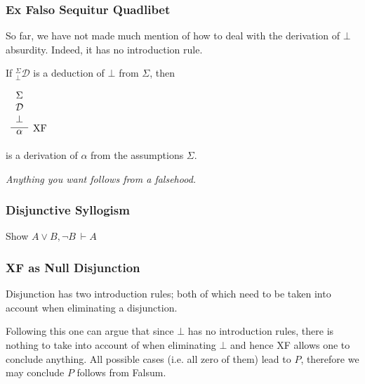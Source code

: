 \documentclass{beamer}
\theoremstyle{indentDefn} \newtheorem{defn}[]{Definition}
\begin{document}
\begin{frame}
	\frametitle{Ex Falso Sequitur Quadlibet}
	
	So far, we have not made much mention of how to deal with the derivation of $\bot$ absurdity. Indeed, it has no introduction rule. 
	
	\vspace{0.5cm}
		
	If $^{\Sigma}_{\bot}\mathcal{D}$ is a deduction of $\bot$ from $\Sigma$, then
	
	\begin{center}		
		$\begin{array}{c}		
		\infer[\text{XF}]{\alpha}
		{\begin{array}{c} \Sigma \\ \mathcal{D} \\ \bot \end{array}}
		\end{array}$
	\end{center}

	is a derivation of $\alpha$ from the assumptions $\Sigma$.
	
	\vspace{0.5cm}
	
	\emph{Anything you want follows from a falsehood.} %
	 
\end{frame}

\begin{frame}
	\frametitle{Disjunctive Syllogism}
	
	Show $A \lor B, \lnot B \ \vdash A$
	\vspace{7cm}
	
\end{frame}

\begin{frame}
	\frametitle{XF as Null Disjunction}

	Disjunction has two introduction rules; both of which need to be taken into account when eliminating a disjunction. 

	Following this one can argue that since $\bot$ has no introduction rules, there is nothing to take into account of when eliminating $\bot$ and hence XF allows one to conclude anything. All possible cases (i.e. all zero of them) lead to $P$, therefore we may conclude $P$ follows from Falsum. 

	\vspace{3cm}

\end{frame}
\end{document}
